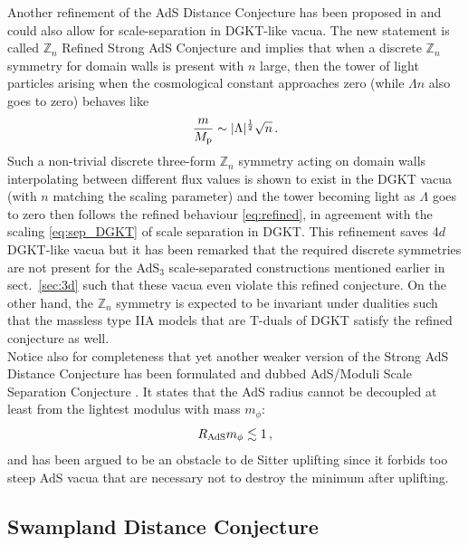 \documentclass[11pt, a4paper]{article}
\newcommand{\Z}{\mathbb{Z}}
\newcommand{\Mp}{M_{\rm p}}
\newcommand{\Rads}{R_{\rm AdS}}
\newcommand{\half}{\frac{1}{2}}
\begin{document}
Another refinement of the AdS Distance Conjecture has been proposed in \cite{Buratti:2020kda} and could also allow for scale-separation in DGKT-like vacua. The new statement is called $\Z_n$ Refined Strong AdS Conjecture and implies that when a discrete $\Z_n$ symmetry for domain walls is present with $n$ large, then the tower of light particles arising when the cosmological constant approaches zero (while $\Lambda n$ also goes to zero) behaves like
\begin{equation}
\label{eq:refined}
\frac{m}{\Mp}\sim |\Lambda|^\half\sqrt{n}\, .
\end{equation}
%
Such a non-trivial discrete three-form $\Z_n$ symmetry acting on domain walls interpolating between different flux values is shown to exist in the DGKT vacua (with $n$ matching the scaling parameter) and the tower becoming light as $\Lambda$ goes to zero then follows the refined behaviour \eqref{eq:refined}, in agreement with the scaling \eqref{eq:sep_DGKT} of scale separation in DGKT. This refinement saves 4$d$ DGKT-like vacua but it has been remarked \cite{Apers:2022zjx} that the required discrete symmetries are not present for the AdS$_3$ scale-separated constructions mentioned earlier in sect.~\ref{sec:3d} such that these vacua even violate this refined conjecture. On the other hand, the $\Z_n$ symmetry is expected to be invariant under dualities such that the massless type IIA models that are T-duals of DGKT satisfy the refined conjecture as well.\\

Notice also for completeness that yet another weaker version of the Strong AdS Distance Conjecture has been formulated \cite{Moritz:2017xto} and dubbed AdS/Moduli Scale Separation Conjecture \cite{Blumenhagen:2019vgj}. It states that the AdS radius cannot be decoupled at least from the lightest modulus with mass $m_\phi$:
\begin{equation}
\Rads m_\phi\lesssim 1\, ,
\end{equation}
%
and has been argued to be an obstacle to de Sitter uplifting since it forbids too steep AdS vacua that are necessary not to destroy the minimum after uplifting.

\subsection{Swampland Distance Conjecture}
\end{document}
